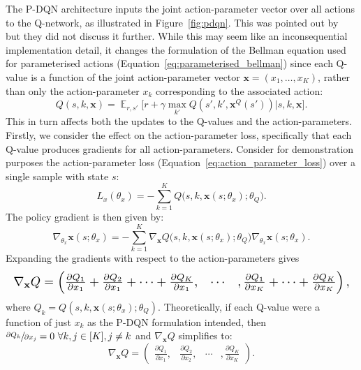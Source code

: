 \documentclass{article}
\newcommand{\Expec}{\displaystyle \mathbb{E}}
\def\PDQN*{P\nobreakdash-DQN}
\newcommand{\citet}[1]
{\citeauthor{#1}~\shortcite{#1}}
\begin{document}
The \PDQN* architecture inputs the joint action-parameter vector over all actions to the Q-network, as illustrated in Figure~\ref{fig:pdqn}. This was pointed out by \citet{xiong2018} but they did not discuss it further. While this may seem like an inconsequential implementation detail, it changes the formulation of the Bellman equation used for parameterised actions (Equation~\ref{eq:parameterised_bellman}) since each Q-value is a function of the joint action-parameter vector \mbox{$\mathbf{x} = \left( x_{1}, \ldots, x_K\right)$}, rather than only the action-parameter $x_k$ corresponding to the associated action:
\begin{equation}\label{eq:parameterised_bellman_joint}
Q(s, k, \mathbf{x}) = \mathop{\Expec}_{r,s'}\Big[r + \gamma \max_{k'}Q(s',k',\mathbf{x}^Q(s'))\Big|s,k,\mathbf{x}\Big].
\end{equation}
This in turn affects both the updates to the Q-values and the action-parameters. Firstly, we consider the effect on the action-parameter loss, specifically that each Q-value produces gradients for all action-parameters. Consider for demonstration purposes the action-parameter loss (Equation~\ref{eq:action_parameter_loss}) over a single sample with state $s$:
\begin{equation}
L_x(\theta_x) = - \sum_{k=1}^K Q\big(s,k,\mathbf{x}(s;\theta_x);\theta_Q\big).
\end{equation}
The policy gradient is then given by:
\begin{equation}
\nabla_{\theta_x}\mathbf{x}(s; \theta_x) = - \sum_{k=1}^K \nabla_\mathbf{x} Q\big(s,k,\mathbf{x}(s;\theta_x);\theta_Q\big) \nabla_{\theta_x}\mathbf{x}(s; \theta_x).
\end{equation}
Expanding the gradients with respect to the action-parameters gives
\begin{equation}
\resizebox{\hsize}{!}{$\nabla_\mathbf{x}Q = \begin{pmatrix}
\frac{\partial Q_1}{\partial x_1} + \frac{\partial Q_2}{\partial x_1} + \cdots + \frac{\partial Q_K}{\partial x_1},  & \cdots & ,\frac{\partial Q_1}{\partial x_K} + \cdots + \frac{\partial Q_K}{\partial x_K} 
\end{pmatrix},$}
\end{equation}
where $Q_k = Q(s,k,\mathbf{x}(s;\theta_x); \theta_Q)$. Theoretically, if each Q-value were a function of just $x_k$ as the \PDQN* formulation intended, then \mbox{$\sfrac{\partial Q_k}{\partial x_j} = 0\ \forall k,j \in [K], j \ne k$} and $\nabla_\mathbf{x}Q$ simplifies to:
\begin{equation}
\nabla_\mathbf{x}Q = \begin{pmatrix}
\frac{\partial Q_1}{\partial x_1}, & \frac{\partial Q_2}{\partial x_2},  & \cdots & ,\frac{\partial Q_K}{\partial x_K} 
\end{pmatrix}.
\end{equation}
\end{document}

